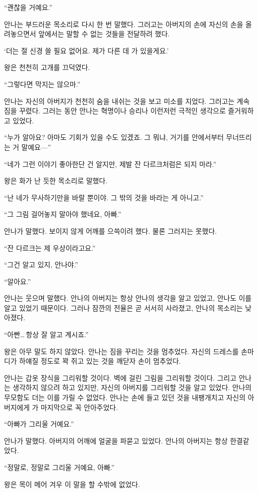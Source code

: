 ``괜찮을 거예요.''

안나는 부드러운 목소리로 다시 한 번 말했다. 그러고는 아버지의 손에 자신의 손을 올려놓으면서 앞에서는 말할 수 없는 것들을 전달하려 했다.

`더는 절 신경 쓸 필요 없어요. 제가 다른 데 가 있을게요.'

왕은 천천히 고개를 끄덕였다.

``그렇다면 막지는 않으마.''

안나는 자신의 아버지가 천천히 숨을 내쉬는 것을 보고 미소를 지었다. 그러고는 계속 짐을 꾸렸다. 그러는 동안 안나는 혁명이나 승리나 이런저런 극적인 생각으로 즐거워하고 있었다.

``누가 알아요? 아마도 기회가 있을 수도 있겠죠. 그 뭐냐, 거기를 안에서부터 무너뜨리는 거 말예요—''

``네가 그런 이야기 좋아한단 건 알지만, 제발 잔 다르크처럼은 되지 마라.''

왕은 화가 난 듯한 목소리로 말했다.

``난 네가 무사하기만을 바랄 뿐이야. 그 밖의 것을 바라는 게 아니고.''

``그 그림 걸어놓지 말아야 했네요, 아빠.''

안나가 말했다. 보이지 않게 어깨를 으쓱이려 했다. 물론 그러지는 못했다.

``잔 다르크는 제 우상이라고요.''

``그건 알고 있지, 안나야.''

``알아요.''

안나는 웃으며 말했다. 안나의 아버지는 항상 안나의 생각을 알고 있었고, 안나도 이를 알고 있었기 때문이다. 그러나 잠깐의 전율은 곧 서서히 사라졌고, 안나의 목소리는 낮아졌다.

``아빤\ldots\,항상 잘 알고 계시죠.''

왕은 아무 말도 하지 않았다. 안나는 짐을 꾸리는 것을 멈추었다. 자신의 드레스를 손마디가 하얘질 정도로 꽉 쥐고 있는 것을 깨닫자 손이 멈추었다.

안나는 갑옷 장식을 그리워할 것이다. 벽에 걸린 그림을 그리워할 것이다. 그리고 안나는 생각하지 않으려 하고 있지만, 자신의 아버지를 그리워할 것을 알고 있었다. 안나의 무모함도 더는 이를 가릴 수 없었다. 안나는 손에 들고 있던 것을 내팽개치고 자신의 아버지에게 가 마지막으로 꼭 안아주었다.

``아빠가 그리울 거예요.''

안나가 말했다. 아버지의 어깨에 얼굴을 파묻고 있었다. 안나의 아버지는 항상 한결같았다.

``정말로, 정말로 그리울 거예요, 아빠.''

왕은 목이 메어 겨우 이 말을 할 수밖에 없었다.

